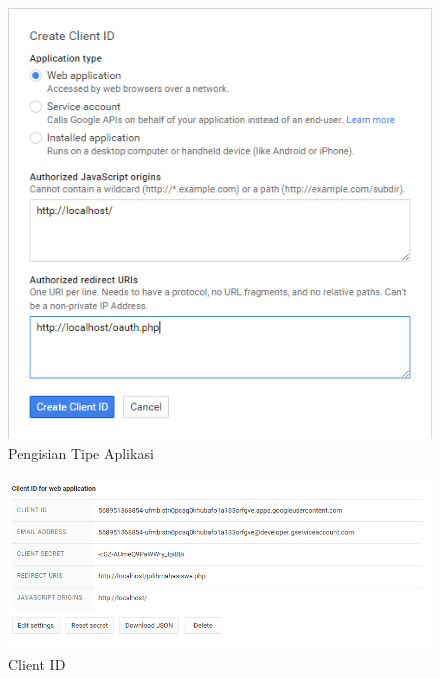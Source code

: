 \begin{figure}[H]
\centering
\includegraphics[scale=0.7]{Gambar/tipeaplikasisudahdiisi.png}
\caption[Pengisian Tipe Aplikasi]{Pengisian Tipe Aplikasi} 
\label{fig:tipeaplikasisudahdiisi}
\end{figure}

\begin{figure}[H]
\centering
\includegraphics[scale=0.7]{Gambar/clientid.png}
\caption[Client ID]{Client ID} 
\label{fig:clientid}
\end{figure}

